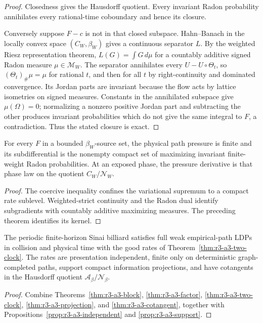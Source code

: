 \begin{proof}
Closedness gives the Hausdorff quotient.  Every invariant Radon probability
annihilates every rational-time coboundary and hence its closure.

Conversely suppose \(F-c\) is not in that closed subspace.  Hahn--Banach in
the locally convex space \((C_W,\beta_W)\) gives a continuous separator
\(L\).  By the weighted Riesz representation theorem, \(L(G)=\int G\,d\mu\)
for a countably additive signed Radon measure \(\mu\in\mathcal M_W\).  The
separator annihilates every \(U-U\circ\Theta_t\), so
\((\Theta_t)_\#\mu=\mu\) for rational \(t\), and then for all \(t\) by
right-continuity and dominated convergence.  Its Jordan parts are invariant
because the flow acts by lattice isometries on signed measures.  Constants in
the annihilated subspace give \(\mu(\Omega)=0\); normalizing a nonzero positive
Jordan part and subtracting the other produces invariant probabilities which
do not give the same integral to \(F\), a contradiction.  Thus the stated
closure is exact.
\end{proof}

\begin{corollary}
\label{cor:r4-a3-strict-tangent}
For every \(F\) in a bounded \(\beta_W\)-source set, the physical path
pressure is finite and its subdifferential is the nonempty compact set of
maximizing invariant finite-weight Radon probabilities.  At an exposed phase,
the pressure derivative is that phase law on the quotient
\(C_W/\mathscr N_W\).
\end{corollary}

\begin{proof}
The coercive inequality confines the variational supremum to a compact rate
sublevel.  Weighted-strict continuity and the Radon dual identify subgradients
with countably additive maximizing measures.  The preceding theorem identifies
its kernel.
\end{proof}

\begin{theorem}
\label{thm:r3-a3-main}
The periodic finite-horizon Sinai billiard satisfies full weak empirical-path
LDPs in collision and physical time with the good rates of
Theorem~\ref{thm:r3-a3-two-clock}.  The rates are presentation independent,
finite only on deterministic graph-completed paths, support compact
information projections, and have cotangents in the Hausdorff quotient
\(\mathscr A_\beta/\mathscr N_\beta\).
\end{theorem}

\begin{proof}
Combine Theorems~\ref{thm:r3-a3-block},
\ref{thm:r3-a3-factor}, \ref{thm:r3-a3-two-clock},
\ref{thm:r3-a3-projection}, and \ref{thm:r3-a3-cotangent}, together with
Propositions~\ref{prop:r3-a3-independent} and
\ref{prop:r3-a3-support}.
\end{proof}
